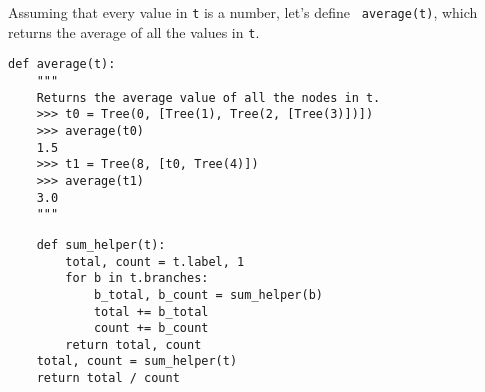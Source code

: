\question Assuming that every value in {\tt t} is a number, let's define {\tt
average(t)}, which returns the average of all the values in {\tt t}.

\begin{lstlisting}
def average(t):
    """
    Returns the average value of all the nodes in t.
    >>> t0 = Tree(0, [Tree(1), Tree(2, [Tree(3)])])
    >>> average(t0)
    1.5
    >>> t1 = Tree(8, [t0, Tree(4)])
    >>> average(t1)
    3.0
    """
\end{lstlisting}
\begin{solution}[1in]
\begin{lstlisting}
    def sum_helper(t):
        total, count = t.label, 1
        for b in t.branches:
            b_total, b_count = sum_helper(b)
            total += b_total
            count += b_count
        return total, count
    total, count = sum_helper(t)
    return total / count
\end{lstlisting}
\end{solution}

